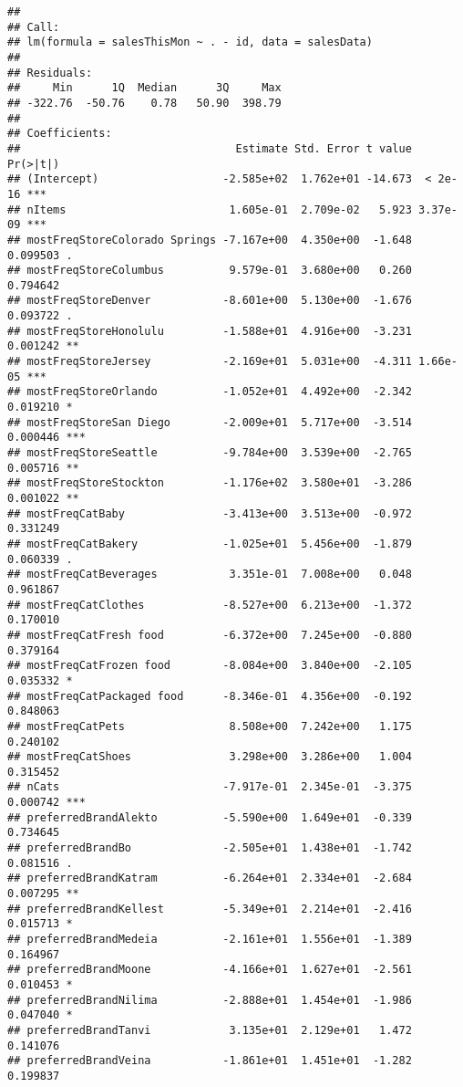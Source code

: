 \documentclass[
]{article}
\begin{document}
\begin{verbatim}
## 
## Call:
## lm(formula = salesThisMon ~ . - id, data = salesData)
## 
## Residuals:
##     Min      1Q  Median      3Q     Max 
## -322.76  -50.76    0.78   50.90  398.79 
## 
## Coefficients:
##                                 Estimate Std. Error t value Pr(>|t|)    
## (Intercept)                   -2.585e+02  1.762e+01 -14.673  < 2e-16 ***
## nItems                         1.605e-01  2.709e-02   5.923 3.37e-09 ***
## mostFreqStoreColorado Springs -7.167e+00  4.350e+00  -1.648 0.099503 .  
## mostFreqStoreColumbus          9.579e-01  3.680e+00   0.260 0.794642    
## mostFreqStoreDenver           -8.601e+00  5.130e+00  -1.676 0.093722 .  
## mostFreqStoreHonolulu         -1.588e+01  4.916e+00  -3.231 0.001242 ** 
## mostFreqStoreJersey           -2.169e+01  5.031e+00  -4.311 1.66e-05 ***
## mostFreqStoreOrlando          -1.052e+01  4.492e+00  -2.342 0.019210 *  
## mostFreqStoreSan Diego        -2.009e+01  5.717e+00  -3.514 0.000446 ***
## mostFreqStoreSeattle          -9.784e+00  3.539e+00  -2.765 0.005716 ** 
## mostFreqStoreStockton         -1.176e+02  3.580e+01  -3.286 0.001022 ** 
## mostFreqCatBaby               -3.413e+00  3.513e+00  -0.972 0.331249    
## mostFreqCatBakery             -1.025e+01  5.456e+00  -1.879 0.060339 .  
## mostFreqCatBeverages           3.351e-01  7.008e+00   0.048 0.961867    
## mostFreqCatClothes            -8.527e+00  6.213e+00  -1.372 0.170010    
## mostFreqCatFresh food         -6.372e+00  7.245e+00  -0.880 0.379164    
## mostFreqCatFrozen food        -8.084e+00  3.840e+00  -2.105 0.035332 *  
## mostFreqCatPackaged food      -8.346e-01  4.356e+00  -0.192 0.848063    
## mostFreqCatPets                8.508e+00  7.242e+00   1.175 0.240102    
## mostFreqCatShoes               3.298e+00  3.286e+00   1.004 0.315452    
## nCats                         -7.917e-01  2.345e-01  -3.375 0.000742 ***
## preferredBrandAlekto          -5.590e+00  1.649e+01  -0.339 0.734645    
## preferredBrandBo              -2.505e+01  1.438e+01  -1.742 0.081516 .  
## preferredBrandKatram          -6.264e+01  2.334e+01  -2.684 0.007295 ** 
## preferredBrandKellest         -5.349e+01  2.214e+01  -2.416 0.015713 *  
## preferredBrandMedeia          -2.161e+01  1.556e+01  -1.389 0.164967    
## preferredBrandMoone           -4.166e+01  1.627e+01  -2.561 0.010453 *  
## preferredBrandNilima          -2.888e+01  1.454e+01  -1.986 0.047040 *  
## preferredBrandTanvi            3.135e+01  2.129e+01   1.472 0.141076    
## preferredBrandVeina           -1.861e+01  1.451e+01  -1.282 0.199837    

\end{verbatim}
\end{document}

